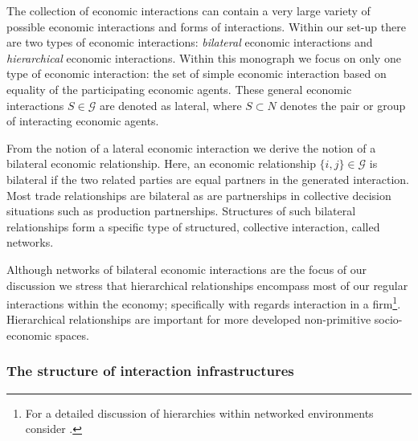 The collection of economic interactions can contain a very large variety of possible economic interactions and forms of interactions. Within our set-up there are two types of economic interactions: \emph{bilateral} economic interactions and \emph{hierarchical} economic interactions. Within this monograph we focus on only one type of economic interaction: the set of simple economic interaction based on equality of the participating economic agents. These general economic interactions $S \in \mathcal{G}$ are denoted as lateral, where $S \subset N$ denotes the pair or group of interacting economic agents.

From the notion of a lateral economic interaction we derive the notion of a bilateral economic relationship. Here, an economic relationship $\{i, j\} \in \mathcal{G}$ is bilateral if the two related parties are equal partners in the generated interaction. Most trade relationships are bilateral as are partnerships in collective decision situations such as production partnerships. Structures of such bilateral relationships form a specific type of structured, collective interaction, called networks.

Although networks of bilateral economic interactions are the focus of our discussion we stress that hierarchical relationships encompass most of our regular interactions within the economy; specifically with regards interaction in a firm\footnote{For a detailed discussion of hierarchies within networked environments consider \citet{Gilles2010}.}. Hierarchical relationships are important for more developed non-primitive socio-economic spaces.

\subsubsection{The structure of interaction infrastructures}

